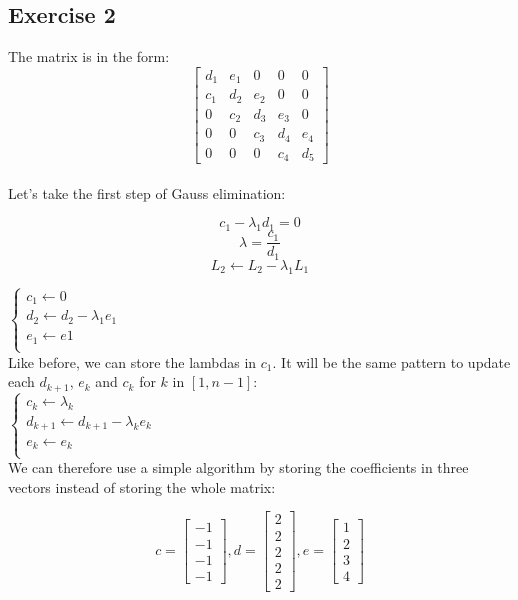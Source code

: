 \documentclass[12pt]{article}
\begin{document}
\subsection{Exercise 2}

The matrix is in the form:
$$\begin{bmatrix}
  d_1 & e_1 & 0 & 0 & 0 \\
  c_1 & d_2 & e_2 & 0 & 0 \\
  0 & c_2 & d_3 & e_3 & 0 \\
  0 & 0 & c_3 & d_4 & e_4 \\
  0 & 0 & 0 & c_4 & d_5
\end{bmatrix}$$ \\

\noindent Let's take the first step of Gauss elimination:

$$ c_1 - \lambda_1 d_1 = 0 $$
$$ \lambda = \frac{c_1}{d_1} $$
$$ L_2 \gets L_2 - \lambda_1 L_1 $$

$\begin{cases}
  c_1 \gets 0 \\
  d_2 \gets d_2 - \lambda_1 e_1 \\
  e_1 \gets e1  \\
\end{cases}$ \\

Like before, we can store the lambdas in $c_1$. It will be the same pattern to update each $d_{k+1}$, $e_k$ and $c_k$ for $k$ in $[1, n-1]$: \\

$\begin{cases}
  c_k \gets \lambda_k \\
  d_{k+1} \gets d_{k+1} - \lambda_k e_k \\
  e_k \gets e_k  \\
\end{cases}$ \\

We can therefore use a simple algorithm by storing the coefficients in three vectors instead of storing the whole matrix:

$$c = \begin{bmatrix}
  -1 \\
  -1 \\
  -1 \\
  -1
\end{bmatrix}, d = \begin{bmatrix}
  2 \\
  2 \\
  2 \\
  2 \\
  2
\end{bmatrix}, e = \begin{bmatrix}
  1 \\
  2 \\
  3 \\
  4
\end{bmatrix}$$ \\
\end{document}
